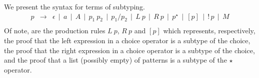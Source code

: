 We present the syntax for terms of subtyping.
\[
   \begin{array}{lcl}
      p & \to & \epsilon \, \mid \, a \, \mid \, A \, 
                    \mid \,  p_1\:p_2 \, \mid \,  p_1 / p_2 \,
                    \mid \, L\:p \, \mid \, R\:p \, 
                    \mid \, p^\star \, \mid \, [p] \, 
                    \mid \, !\,p \, \mid \, M \\
   \end{array}
\]
Of note, are the production rules \(L\:p\), \(R\:p\) and \([p]\) which represents,
respectively, the proof that the left expression in a choice operator is a subtype
of the choice, the proof that the right expression in a choice operator is a subtype
of the choice, and the proof that a list (possibly empty) of patterns is a subtype 
of the \(\star\) operator.

